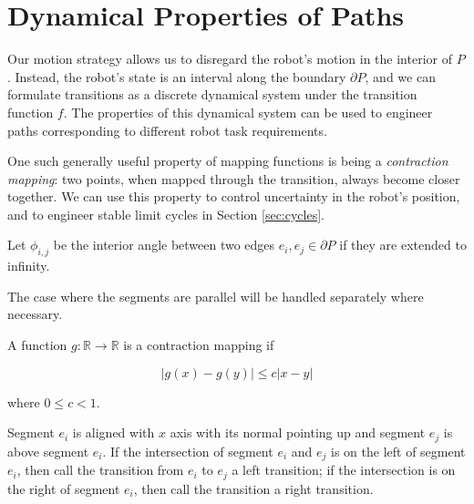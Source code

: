 \documentclass[]{styles/svproc}  %
\begin{document}
\section{Dynamical Properties of Paths}


Our motion strategy allows us to disregard the robot's motion in the interior of
$P$. Instead, the robot's state is an interval 
along the boundary $\partial P$, and we can formulate transitions as a discrete
dynamical system under the transition function $f$. The properties of this
dynamical system can be used to engineer paths corresponding to different robot
task requirements.

One such generally useful property of mapping functions is being a \emph{contraction mapping}: 
two points, when mapped through the
transition, always become closer together. We can use this property to control
uncertainty in the robot's position, and to engineer stable limit cycles in
Section \ref{sec:cycles}.

\begin{definition}
Let $\phi_{i,j}$ be the interior angle between two edges $e_i, e_j \in \partial P$ if
they are extended to infinity. 
\end{definition}

The case where the segments are parallel will be
handled separately where necessary. 

\begin{definition}

A function $g: \mathbb{R} \to \mathbb{R}$ is a contraction mapping if

\begin{equation*}
|g(x) - g(y)| \leq c |x-y|
\end{equation*}

\noindent
where $0 \leq c < 1$.
\end{definition}

\begin{definition}
Segment $e_i$ is aligned with $x$ axis with its normal pointing up and
segment $e_j$ is above segment $e_i$. If the intersection of segment $e_i$ and
$e_j$ is
on the left of segment $e_i$, then call the transition from $e_i$ to $e_j$ a left
transition; if the intersection is on the right of segment $e_i$, then call the
transition a right transition.
\end{definition}
\end{document}
